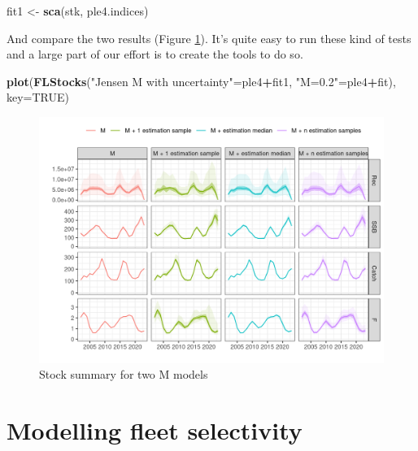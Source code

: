 \documentclass[
]{book}
\newenvironment{Shaded}{\begin{snugshade}}{\end{snugshade}}
\newcommand{\AttributeTok}[1]{\textcolor[rgb]{0.13,0.29,0.53}{#1}}
\newcommand{\ConstantTok}[1]{\textcolor[rgb]{0.56,0.35,0.01}{#1}}
\newcommand{\FunctionTok}[1]{\textcolor[rgb]{0.13,0.29,0.53}{\textbf{#1}}}
\newcommand{\NormalTok}[1]{#1}
\newcommand{\OtherTok}[1]{\textcolor[rgb]{0.56,0.35,0.01}{#1}}
\newcommand{\SpecialCharTok}[1]{\textcolor[rgb]{0.81,0.36,0.00}{\textbf{#1}}}
\newcommand{\StringTok}[1]{\textcolor[rgb]{0.31,0.60,0.02}{#1}}
\begin{document}
\begin{Shaded}
\begin{Highlighting}[]
\NormalTok{fit1 }\OtherTok{\textless{}{-}} \FunctionTok{sca}\NormalTok{(stk, ple4.indices)}
\end{Highlighting}
\end{Shaded}

And compare the two results (Figure \ref{fig:mprop}). It's quite easy to run these kind of tests and a large part of our effort is to create the tools to do so.

\begin{Shaded}
\begin{Highlighting}[]
\FunctionTok{plot}\NormalTok{(}\FunctionTok{FLStocks}\NormalTok{(}\StringTok{"Jensen M with uncertainty"}\OtherTok{=}\NormalTok{ple4}\SpecialCharTok{+}\NormalTok{fit1, }\StringTok{"M=0.2"}\OtherTok{=}\NormalTok{ple4}\SpecialCharTok{+}\NormalTok{fit), }\AttributeTok{key=}\ConstantTok{TRUE}\NormalTok{)}
\end{Highlighting}
\end{Shaded}

\begin{figure}
\centering
\includegraphics{_bookdown_files/_main_files/figure-html/mprop-1.png}
\caption{\label{fig:mprop}Stock summary for two M models}
\end{figure}

\hypertarget{modelling-fleet-selectivity}{%
\chapter{Modelling fleet selectivity}\label{modelling-fleet-selectivity}}
\end{document}
